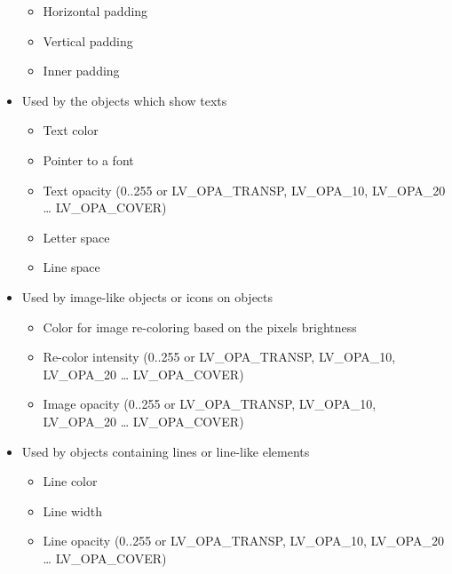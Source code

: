 \documentclass[letterpaper,10pt,english]{sphinxmanual}
\begin{document}
\begin{itemize}
\begin{itemize}
\item {} 
 Horizontal padding

\item {} 
 Vertical padding

\item {} 
 Inner padding

\end{itemize}

\item {} 
 Used by the objects which show texts
\begin{itemize}
\item {} 
 Text color

\item {} 
 Pointer to a font

\item {} 
 Text opacity (0..255 or LV\_OPA\_TRANSP, LV\_OPA\_10, LV\_OPA\_20 … LV\_OPA\_COVER)

\item {} 
 Letter space

\item {} 
 Line space

\end{itemize}

\item {} 
 Used by image-like objects or icons on objects
\begin{itemize}
\item {} 
 Color for image re-coloring based on the pixels brightness

\item {} 
 Re-color intensity (0..255 or LV\_OPA\_TRANSP, LV\_OPA\_10, LV\_OPA\_20 … LV\_OPA\_COVER)

\item {} 
 Image opacity (0..255 or LV\_OPA\_TRANSP, LV\_OPA\_10, LV\_OPA\_20 … LV\_OPA\_COVER)

\end{itemize}

\item {} 
 Used by objects containing lines or line-like elements
\begin{itemize}
\item {} 
 Line color

\item {} 
 Line width

\item {} 
 Line opacity (0..255 or LV\_OPA\_TRANSP, LV\_OPA\_10, LV\_OPA\_20 … LV\_OPA\_COVER)

\end{itemize}

\end{itemize}
\end{document}
